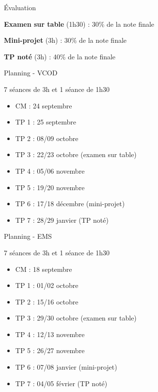 \begin{frame}{Évaluation}

    \textbf{Examen sur table} (1h30) : 30\% de la note finale

    \textbf{Mini-projet} (3h) : 30\% de la note finale

    \textbf{TP noté} (3h) : 40\% de la note finale

\end{frame}

\begin{frame}{Planning - VCOD}

    7 séances de 3h et 1 séance de 1h30\\

    \begin{itemize}
         \item CM : 24 septembre
         \item TP 1 : 25 septembre
         \item TP 2 : 08/09 octobre
         \item TP 3 : 22/23 octobre (examen sur table)
         \item TP 4 : 05/06 novembre
         \item TP 5 : 19/20 novembre
         \item TP 6 : 17/18 décembre (mini-projet)
         \item TP 7 : 28/29 janvier (TP noté)
    \end{itemize}

\end{frame}

\begin{frame}{Planning - EMS}

    7 séances de 3h et 1 séance de 1h30\\

    \begin{itemize}
         \item CM : 18 septembre
         \item TP 1 : 01/02 octobre
         \item TP 2 : 15/16 octobre
         \item TP 3 : 29/30 octobre (examen sur table)
         \item TP 4 : 12/13 novembre
         \item TP 5 : 26/27 novembre
         \item TP 6 : 07/08 janvier (mini-projet)
         \item TP 7 : 04/05 février (TP noté)
    \end{itemize}

\end{frame}

